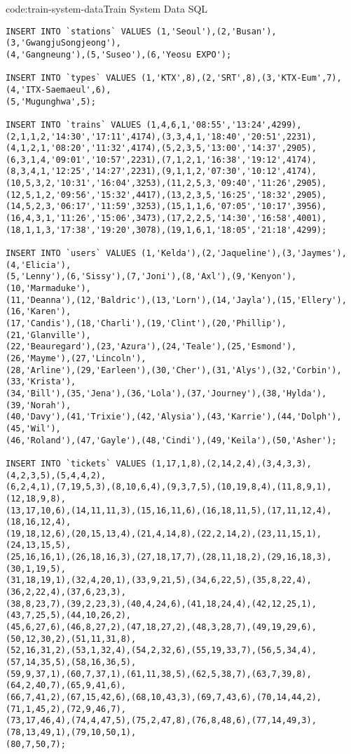 \begin{codeenv}{code:train-system-data}{Train System Data SQL}\begin{verbatim}
INSERT INTO `stations` VALUES (1,'Seoul'),(2,'Busan'),(3,'GwangjuSongjeong'),
(4,'Gangneung'),(5,'Suseo'),(6,'Yeosu EXPO');

INSERT INTO `types` VALUES (1,'KTX',8),(2,'SRT',8),(3,'KTX-Eum',7),(4,'ITX-Saemaeul',6),
(5,'Mugunghwa',5);

INSERT INTO `trains` VALUES (1,4,6,1,'08:55','13:24',4299),
(2,1,1,2,'14:30','17:11',4174),(3,3,4,1,'18:40','20:51',2231),
(4,1,2,1,'08:20','11:32',4174),(5,2,3,5,'13:00','14:37',2905),
(6,3,1,4,'09:01','10:57',2231),(7,1,2,1,'16:38','19:12',4174),
(8,3,4,1,'12:25','14:27',2231),(9,1,1,2,'07:30','10:12',4174),
(10,5,3,2,'10:31','16:04',3253),(11,2,5,3,'09:40','11:26',2905),
(12,5,1,2,'09:56','15:32',4417),(13,2,3,5,'16:25','18:32',2905),
(14,5,2,3,'06:17','11:59',3253),(15,1,1,6,'07:05','10:17',3956),
(16,4,3,1,'11:26','15:06',3473),(17,2,2,5,'14:30','16:58',4001),
(18,1,1,3,'17:38','19:20',3078),(19,1,6,1,'18:05','21:18',4299);

INSERT INTO `users` VALUES (1,'Kelda'),(2,'Jaqueline'),(3,'Jaymes'),(4,'Elicia'),
(5,'Lenny'),(6,'Sissy'),(7,'Joni'),(8,'Axl'),(9,'Kenyon'),(10,'Marmaduke'),
(11,'Deanna'),(12,'Baldric'),(13,'Lorn'),(14,'Jayla'),(15,'Ellery'),(16,'Karen'),
(17,'Candis'),(18,'Charli'),(19,'Clint'),(20,'Phillip'),(21,'Glanville'),
(22,'Beauregard'),(23,'Azura'),(24,'Teale'),(25,'Esmond'),(26,'Mayme'),(27,'Lincoln'),
(28,'Arline'),(29,'Earleen'),(30,'Cher'),(31,'Alys'),(32,'Corbin'),(33,'Krista'),
(34,'Bill'),(35,'Jena'),(36,'Lola'),(37,'Journey'),(38,'Hylda'),(39,'Norah'),
(40,'Davy'),(41,'Trixie'),(42,'Alysia'),(43,'Karrie'),(44,'Dolph'),(45,'Wil'),
(46,'Roland'),(47,'Gayle'),(48,'Cindi'),(49,'Keila'),(50,'Asher');

INSERT INTO `tickets` VALUES (1,17,1,8),(2,14,2,4),(3,4,3,3),(4,2,3,5),(5,4,4,2),
(6,2,4,1),(7,19,5,3),(8,10,6,4),(9,3,7,5),(10,19,8,4),(11,8,9,1),(12,18,9,8),
(13,17,10,6),(14,11,11,3),(15,16,11,6),(16,18,11,5),(17,11,12,4),(18,16,12,4),
(19,18,12,6),(20,15,13,4),(21,4,14,8),(22,2,14,2),(23,11,15,1),(24,13,15,5),
(25,16,16,1),(26,18,16,3),(27,18,17,7),(28,11,18,2),(29,16,18,3),(30,1,19,5),
(31,18,19,1),(32,4,20,1),(33,9,21,5),(34,6,22,5),(35,8,22,4),(36,2,22,4),(37,6,23,3),
(38,8,23,7),(39,2,23,3),(40,4,24,6),(41,18,24,4),(42,12,25,1),(43,7,25,5),(44,10,26,2),
(45,6,27,6),(46,8,27,2),(47,18,27,2),(48,3,28,7),(49,19,29,6),(50,12,30,2),(51,11,31,8),
(52,16,31,2),(53,1,32,4),(54,2,32,6),(55,19,33,7),(56,5,34,4),(57,14,35,5),(58,16,36,5),
(59,9,37,1),(60,7,37,1),(61,11,38,5),(62,5,38,7),(63,7,39,8),(64,2,40,7),(65,9,41,6),
(66,7,41,2),(67,15,42,6),(68,10,43,3),(69,7,43,6),(70,14,44,2),(71,1,45,2),(72,9,46,7),
(73,17,46,4),(74,4,47,5),(75,2,47,8),(76,8,48,6),(77,14,49,3),(78,13,49,1),(79,10,50,1),
(80,7,50,7);
\end{verbatim}
\end{codeenv}

